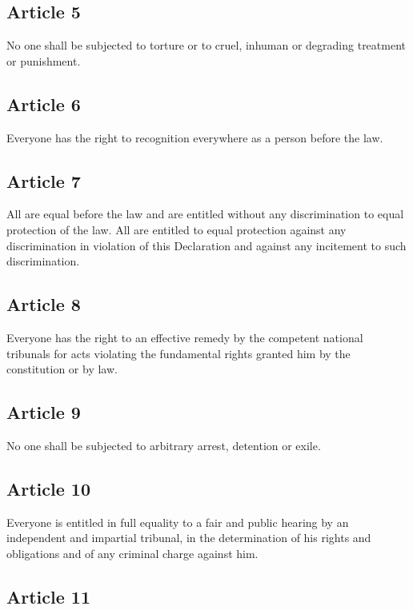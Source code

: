 \documentclass[
  ngerman,
  american,
  titlepage,
  openright,
  DIV=calc,
  toc=listof,
  listof=nochaptergap]{scrbook}
\begin{document}
\subsection{Article 5}\label{article-5}

No one shall be subjected to torture or to cruel, inhuman or degrading
treatment or punishment.

\subsection{Article 6}\label{article-6}

Everyone has the right to recognition everywhere as a person before the
law.

\subsection{Article 7}\label{article-7}

All are equal before the law and are entitled without any discrimination
to equal protection of the law. All are entitled to equal protection
against any discrimination in violation of this Declaration and against
any incitement to such discrimination.

\subsection{Article 8}\label{article-8}

Everyone has the right to an effective remedy by the competent national
tribunals for acts violating the fundamental rights granted him by the
constitution or by law.

\subsection{Article 9}\label{article-9}

No one shall be subjected to arbitrary arrest, detention or exile.

\subsection{Article 10}\label{article-10}

Everyone is entitled in full equality to a fair and public hearing by an
independent and impartial tribunal, in the determination of his rights
and obligations and of any criminal charge against him.

\subsection{Article 11}\label{article-11}
\end{document}
